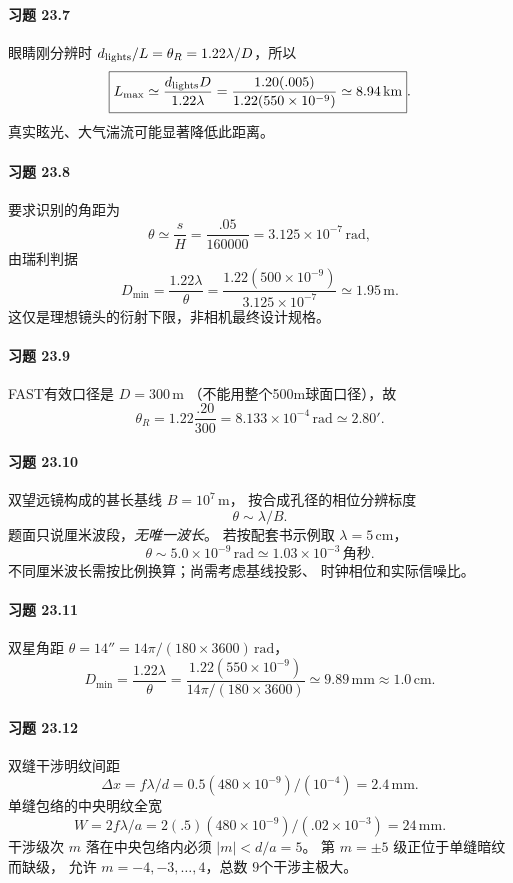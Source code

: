 \paragraph{习题 23.7}
眼睛刚分辨时
\(d_{\rm lights}/L=\theta_R=1.22\lambda/D\)，所以
\[
\boxed{L_{\max}\simeq\frac{d_{\rm lights}D}{1.22\lambda}
=\frac{1.20(.005)}{1.22(550\times10^{-9})}
\simeq8.94\,\mathrm{km}}.
\]
真实眩光、大气湍流可能显著降低此距离。
\paragraph{习题 23.8}
要求识别的角距为
\[
\boxed{\theta\simeq\frac{s}{H}
=\frac{.05}{160000}
=3.125\times10^{-7}\,\mathrm{rad}},
\]
由瑞利判据
\[
\boxed{D_{\min}=\frac{1.22\lambda}{\theta}
=\frac{1.22(500\times10^{-9})}{3.125\times10^{-7}}
\simeq1.95\,\mathrm m}.
\]
这仅是理想镜头的衍射下限，非相机最终设计规格。
\paragraph{习题 23.9}
FAST有效口径是 \(D=300\,\mathrm m\)
（不能用整个500m球面口径），故
\[
\boxed{\theta_R=1.22\frac{.20}{300}
=8.133\times10^{-4}\,\mathrm{rad}
\simeq2.80'}.
\]
\paragraph{习题 23.10}
双望远镜构成的甚长基线 \(B=10^7\,\mathrm m\)，
按合成孔径的相位分辨标度
\[
\boxed{\theta\sim\lambda/B}.
\]
题面只说厘米波段，\emph{无唯一波长}。
若按配套书示例取 \(\lambda=5\,\mathrm{cm}\)，
\[
\boxed{\theta\sim5.0\times10^{-9}\,\mathrm{rad}
\simeq1.03\times10^{-3}\,\text{角秒}}.
\]
不同厘米波长需按比例换算；尚需考虑基线投影、
时钟相位和实际信噪比。
\paragraph{习题 23.11}
双星角距 \(\theta=14''=14\pi/(180\times3600)\,\mathrm{rad}\)，
\[
\boxed{D_{\min}=\frac{1.22\lambda}{\theta}
=\frac{1.22(550\times10^{-9})}{14\pi/(180\times3600)}
\simeq9.89\,\mathrm{mm}\approx1.0\,\mathrm{cm}}.
\]
\paragraph{习题 23.12}
双缝干涉明纹间距
\[
\boxed{\Delta x=f\lambda/d
=0.5(480\times10^{-9})/(10^{-4})=2.4\,\mathrm{mm}}.
\]
单缝包络的中央明纹全宽
\[
\boxed{W=2f\lambda/a
=2(.5)(480\times10^{-9})/(.02\times10^{-3})
=24\,\mathrm{mm}}.
\]
干涉级次 \(m\) 落在中央包络内必须
\(|m|<d/a=5\)。
第 \(m=\pm5\) 级正位于单缝暗纹而缺级，
允许 \(m=-4,-3,\dots,4\)，总数
\(\boxed{9\text{个干涉主极大}}\)。

